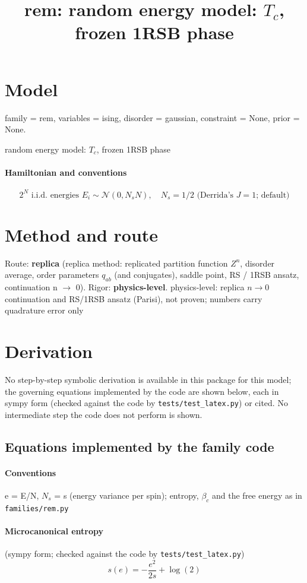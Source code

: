 \documentclass[11pt]{article}
\title{rem: random energy model: $T_{c}$, frozen 1RSB phase}
\date{}
\begin{document}
\maketitle
\section{Model}
family = rem, variables = ising, disorder = gaussian, constraint = None, prior = None.

random energy model: $T_{c}$, frozen 1RSB phase \cite{b1,b2}

\paragraph{Hamiltonian and conventions} \cite{b1,b2}
\begin{equation}
2^N \text{ i.i.d. energies } E_i \sim \mathcal{N}(0, N_s N),\quad N_s = 1/2 \text{ (Derrida's } J = 1\text{; default)}
\end{equation}
\section{Method and route}
Route: \textbf{replica} (replica method: replicated partition function $Z^{n}$, disorder average, order parameters $q_{ab}$ (and conjugates), saddle point, RS / 1RSB ansatz, continuation n $\to$ 0). Rigor: \textbf{physics-level}. physics-level: replica $n \to 0$ continuation and RS/1RSB ansatz (Parisi), not proven; numbers carry quadrature error only
\section{Derivation}
No step-by-step symbolic derivation is available in this package for this model; the governing equations implemented by the code are shown below, each in sympy form (checked against the code by \texttt{tests/test\_latex.py}) or cited.  No intermediate step the code does not perform is shown.
\subsection{Equations implemented by the family code}
\paragraph{Conventions}
e = E/N, $N_{s}$ = s (energy variance per spin); entropy, $\beta _{c}$ and the free energy as in \texttt{families/rem.py}
\paragraph{Microcanonical entropy} \cite{b1,b2} (sympy form; checked against the code by \texttt{tests/test\_latex.py})
\begin{equation}
s{\left(e \right)} = - \frac{e^{2}}{2 s} + \log{\left(2 \right)}
\end{equation}
\end{document}
